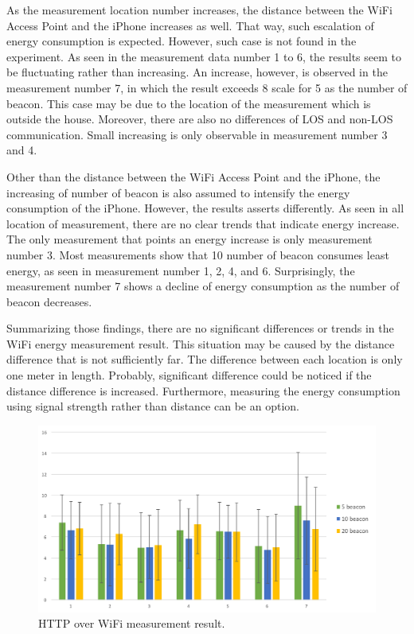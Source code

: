 \documentclass[journal]{vgtc}                %
\begin{document}
As the measurement location number increases, the distance between the WiFi Access Point and the iPhone increases as well. That way, such escalation of energy consumption is expected. However, such case is not found in the experiment. As seen in the measurement data number 1 to 6, the results seem to be fluctuating rather than increasing. An increase, however, is observed in the measurement number 7, in which the result exceeds 8 scale for 5 as the number of beacon. This case may be due to the location of the measurement which is outside the house. Moreover, there are also no differences of LOS and non-LOS communication. Small increasing is only observable in measurement number 3 and 4.

Other than the distance between the WiFi Access Point and the iPhone, the increasing of number of beacon is also assumed to intensify the energy consumption of the iPhone. However, the results asserts differently. As seen in all location of measurement, there are no clear trends that indicate energy increase. The only measurement that points an energy increase is only measurement number 3. Most measurements show that 10 number of beacon consumes least energy, as seen in measurement number 1, 2, 4, and 6. Surprisingly, the measurement number 7 shows a decline of energy consumption as the number of beacon decreases.

Summarizing those findings, there are no significant differences or trends in the WiFi energy measurement result. This situation may be caused by the distance difference that is not sufficiently far. The difference between each location is only one meter in length. Probably, significant difference could be noticed if the distance difference is increased. Furthermore, measuring the energy consumption using signal strength rather than distance can be an option.

\begin{figure}
  \centering
    \includegraphics[width=.5\textwidth]{wifi}
  \caption{HTTP over WiFi measurement result.}
  \label{fig:wifi-result}
\end{figure}
\end{document}
